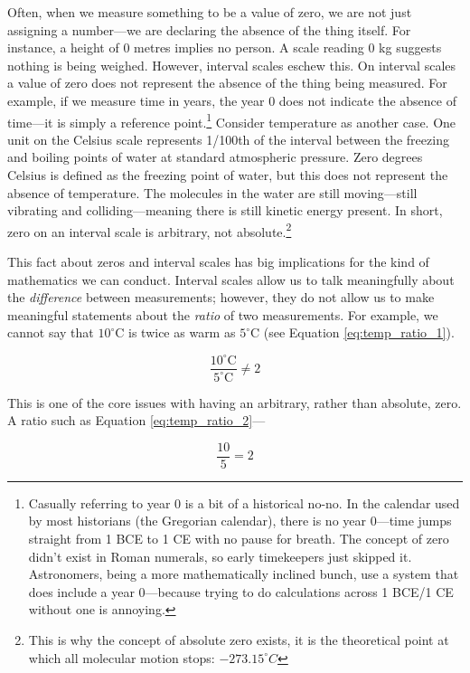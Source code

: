 Often, when we measure something to be a value of zero, we are not just assigning a number—we are declaring the absence of the thing itself. For instance, a height of 0 metres implies no person. A scale reading 0 kg suggests nothing is being weighed. However, interval scales eschew this. On interval scales a value of zero does not represent the absence of the thing being measured. For example, if we measure time in years, the year 0 does not indicate the absence of time—it is simply a reference point.\footnote{Casually referring to year 0 is a bit of a historical no-no. In the calendar used by most historians (the Gregorian calendar), there is no year 0—time jumps straight from 1 BCE to 1 CE with no pause for breath. The concept of zero didn’t exist in Roman numerals, so early timekeepers just skipped it. Astronomers, being a more mathematically inclined bunch, use a system that does include a year 0—because trying to do calculations across 1 BCE/1 CE without one is annoying.} Consider temperature as another case. One unit on the Celsius scale represents 1/100th of the interval between the freezing and boiling points of water at standard atmospheric pressure. Zero degrees Celsius is defined as the freezing point of water, but this does not represent the absence of temperature. The molecules in the water are still moving—still vibrating and colliding—meaning there is still kinetic energy present. In short, zero on an interval scale is arbitrary, not absolute.\footnote{This is why the concept of absolute zero exists, it is the theoretical point at which all molecular motion stops: $−273.15^\circ C$}

This fact about zeros and interval scales has big implications for the kind of mathematics we can conduct. Interval scales allow us to talk meaningfully about the \textit{difference} between measurements; however, they do not allow us to make meaningful statements about the \textit{ratio} of two measurements. For example, we cannot say that $10^\circ$C is twice as warm as $5^\circ$C (see Equation \ref{eq:temp_ratio_1}).

\begin{equation}
\frac{10^\circ \text{C}}{5^\circ \text{C}} \neq 2
\label{eq:temp_ratio_1}
\end{equation}

\noindent
This is one of the core issues with having an arbitrary, rather than absolute, zero. A ratio such as Equation \ref{eq:temp_ratio_2}—

\begin{equation}
\frac{10}{5} = 2
\label{eq:temp_ratio_2}
\end{equation}

